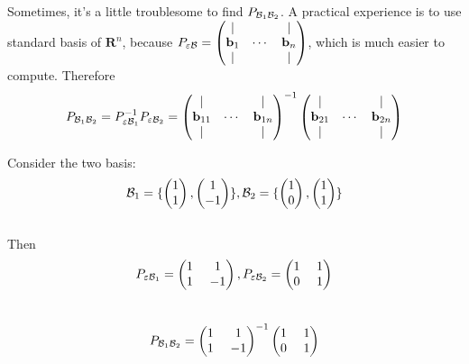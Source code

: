 Sometimes, it's a little troublesome to find $P_{\mathcal{B}_1 \mathcal{B}_2}$. A practical experience is to use standard basis of $\mathbf{R}^n$, because $P_{ \varepsilon \mathcal{B}} = \begin{pmatrix}
    |& \ & | \\
    \mathbf{b}_1& \cdots& \mathbf{b}_n \\
    |& \ & | \\
\end{pmatrix}$, which is much easier to compute. Therefore 
$$P_{\mathcal{B}_1 \mathcal{B}_2} = P_{\varepsilon \mathcal{B}_1}^{-1}P_{\varepsilon \mathcal{B}_2} = \begin{pmatrix}
    |& \ & | \\
    \mathbf{b}_{11}& \cdots& \mathbf{b}_{1n} \\
    |& \ & | \\
\end{pmatrix}^{-1}\begin{pmatrix}
    |& \ & | \\
    \mathbf{b}_{21}& \cdots& \mathbf{b}_{2n} \\
    |& \ & | \\
\end{pmatrix}$$
\begin{eg}
    Consider the two basis:\\
    $$\mathcal{B}_1 = \{
        \begin{pmatrix}
            1\\1
        \end{pmatrix},
        \begin{pmatrix}
            1\\-1
        \end{pmatrix}\},
    \mathcal{B}_2 = \{
        \begin{pmatrix}
            1\\0
        \end{pmatrix},
        \begin{pmatrix}
            1\\1
        \end{pmatrix}\}$$\\
        Then $$P_{\varepsilon \mathcal{B}_1}=\begin{pmatrix}
            1 \ & 1\\1 \ & -1
        \end{pmatrix}, P_{\varepsilon \mathcal{B}_2}=\begin{pmatrix}
            1 \ & 1\\0 \ & 1
        \end{pmatrix}$$\\  

        $$P_{\mathcal{B}_1 \mathcal{B}_2} = \begin{pmatrix}
            1 \ & 1\\1 \ & -1
        \end{pmatrix}^{-1}\begin{pmatrix}
            1 \ & 1\\0 \ & 1
        \end{pmatrix}$$
\end{eg}

